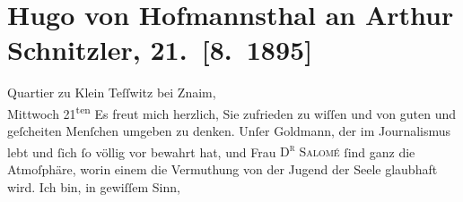 

         
         \renewcommand{\erwaehntePersonen}{Personen: Lou Andreas-Salomé, Paul Goldmann}
         \renewcommand{\erwaehnteInstitutionen}{Institutionen: Hoch- und Deutschmeisterkapelle}
         \renewcommand{\erwaehnteOrte}{Orte: Dobšice u Znojma, Wien, Znaim, Znojmo}
         \renewcommand{\erwaehnteWerke}{Werke: Faust. Eine Tragödie, Wilhelm Meisters Wanderjahre}
               \section[Hugo von Hofmannsthal an Arthur Schnitzler, 21. {[}8. 1895{]}]{ Hugo von Hofmannsthal an Arthur Schnitzler, 21. {[}8. 1895{]}}\nopagebreak{}\rehead{ }\begin{ledgroupsized}[t]{13cm}\normalsize\beginnumbering \toendnotes[C]{\smallbreak\pagebreak[2]} 
\toendnotes[C]{\smallbreak}\pstart
           \raggedleft{}{\pb}Quartier zu Klein Teſſwitz bei Znaim,{\\}Mittwoch 21\textsuperscript{ten}\pend
           \pstart
           Es freut mich herzlich, Sie zufrieden zu wiſſen und von guten und geſcheiten Menſchen
               umgeben zu denken. Unſer Goldmann, der im
               Journalismus lebt und ſich ſo völlig vor \textsc{\label{K_L00476-1v}\label{K_L00476-1h}} bewahrt hat, und Frau \textsc{D\textsuperscript{r}{ }Salomé}{ }ſind ganz die Atmoſphäre, worin einem die
               Vermuthung von der Jugend der Seele glaubhaft wird. Ich bin, in gewiſſem Sinn,

\end{ledgroupsized}
